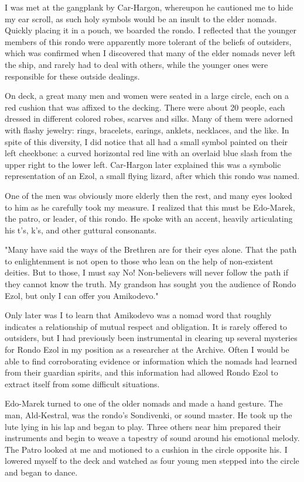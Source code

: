 I was met at the gangplank by Car-Hargon, whereupon he cautioned me to hide my ear scroll, as such holy symbols would be an insult to the elder nomads. Quickly placing it in a pouch, we boarded the rondo. I reflected that the younger members of this rondo were apparently more tolerant of the beliefs of outsiders, which was confirmed when I discovered that many of the elder nomads never left the ship, and rarely had to deal with others, while the younger ones were responsible for these outside dealings.

On deck, a great many men and women were seated in a large circle, each on a red cushion that was affixed to the decking. There were about 20 people, each dressed in different colored robes, scarves and silks. Many of them were adorned with flashy jewelry: rings, bracelets, earings, anklets, necklaces, and the like. In spite of this diversity, I did notice that all had a small symbol painted on their left cheekbone: a curved horizontal red line with an overlaid blue slash from the upper right to the lower left. Car-Hargon later explained this was a symbolic representation of an Ezol, a small flying lizard, after which this rondo was named.

One of the men was obviously more elderly then the rest, and many eyes looked to him as he carefully took my measure. I realized that this must be Edo-Marek, the patro, or leader, of this rondo. He spoke with an accent, heavily articulating his t's, k's, and other guttural consonants.

"Many have said the ways of the Brethren are for their eyes alone. That the path to enlightenment is not open to those who lean on the help of non-existent deities. But to those, I must say No! Non-believers will never follow the path if they cannot know the truth. My grandson has sought you the audience of Rondo Ezol, but only I can offer you Amikodevo."

Only later was I to learn that Amikodevo was a nomad word that roughly indicates a relationship of mutual respect and obligation. It is rarely offered to outsiders, but I had previously been instrumental in clearing up several mysteries for Rondo Ezol in my position as a researcher at the Archive. Often I would be able to find corroborating evidence or information which the nomads had learned from their guardian spirits, and this information had allowed Rondo Ezol to extract itself from some difficult situations.

Edo-Marek turned to one of the older nomads and made a hand gesture. The man, Ald-Kestral, was the rondo's Sondivenki, or sound master. He took up the lute lying in his lap and began to play. Three others near him prepared their instruments and begin to weave a tapestry of sound around his emotional melody. The Patro looked at me and motioned to a cushion in the circle opposite his. I lowered myself to the deck and watched as four young men stepped into the circle and began to dance.

